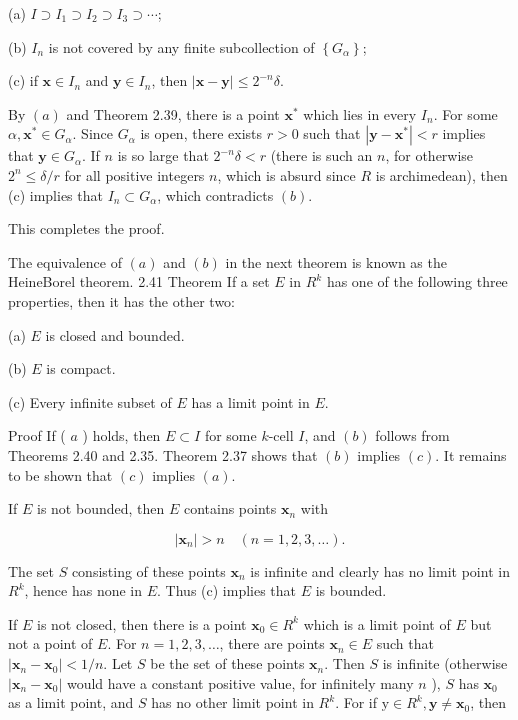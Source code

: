 \documentclass[10pt]{article}
\begin{document}
(a) $I \supset I_{1} \supset I_{2} \supset I_{3} \supset \cdots$;

(b) $I_{n}$ is not covered by any finite subcollection of $\left\{G_{\alpha}\right\}$;

(c) if $\mathbf{x} \in I_{n}$ and $\mathbf{y} \in I_{n}$, then $|\mathbf{x}-\mathbf{y}| \leq 2^{-n} \delta$.

By $(a)$ and Theorem 2.39, there is a point $\mathbf{x}^{*}$ which lies in every $I_{n}$. For some $\alpha, \mathbf{x}^{*} \in G_{\alpha}$. Since $G_{\alpha}$ is open, there exists $r>0$ such that $\left|\mathbf{y}-\mathbf{x}^{*}\right|<r$ implies that $\mathbf{y} \in G_{\alpha}$. If $n$ is so large that $2^{-n} \delta<r$ (there is such an $n$, for otherwise $2^{n} \leq \delta / r$ for all positive integers $n$, which is absurd since $R$ is archimedean), then (c) implies that $I_{n} \subset G_{\alpha}$, which contradicts $(b)$.

This completes the proof.

The equivalence of $(a)$ and $(b)$ in the next theorem is known as the HeineBorel theorem. 2.41 Theorem If a set $E$ in $R^{k}$ has one of the following three properties, then it has the other two:

(a) $E$ is closed and bounded.

(b) $E$ is compact.

(c) Every infinite subset of $E$ has a limit point in $E$.

Proof If ( $a$ ) holds, then $E \subset I$ for some $k$-cell $I$, and $(b)$ follows from Theorems 2.40 and 2.35. Theorem 2.37 shows that $(b)$ implies $(c)$. It remains to be shown that $(c)$ implies $(a)$.

If $E$ is not bounded, then $E$ contains points $\mathbf{x}_{n}$ with

$$
\left|\mathbf{x}_{n}\right|>n \quad(n=1,2,3, \ldots) .
$$

The set $S$ consisting of these points $\mathbf{x}_{n}$ is infinite and clearly has no limit point in $R^{k}$, hence has none in $E$. Thus (c) implies that $E$ is bounded.

If $E$ is not closed, then there is a point $\mathbf{x}_{0} \in R^{k}$ which is a limit point of $E$ but not a point of $E$. For $n=1,2,3, \ldots$, there are points $\mathbf{x}_{n} \in E$ such that $\left|\mathbf{x}_{n}-\mathbf{x}_{0}\right|<1 / n$. Let $S$ be the set of these points $\mathbf{x}_{n}$. Then $S$ is infinite (otherwise $\left|\mathbf{x}_{n}-\mathbf{x}_{0}\right|$ would have a constant positive value, for infinitely many $n$ ), $S$ has $\mathbf{x}_{0}$ as a limit point, and $S$ has no other limit point in $R^{k}$. For if $\mathrm{y} \in R^{k}, \mathbf{y} \neq \mathbf{x}_{0}$, then
\end{document}
